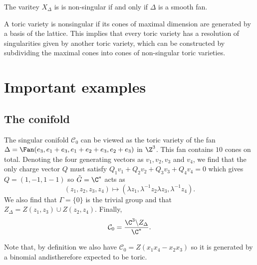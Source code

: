 \documentclass{worksheetclass}
\begin{document}
    \begin{prop*}
        The varitey $X_\Delta$ is is non-singular if and only if $\Delta$ is a smooth fan.
    \end{prop*}


    A toric variety is nonsingular if its cones of maximal dimension are generated by a basis of the lattice. This implies that every toric variety has a resolution of singularities given by another toric variety, which can be constructed by subdividing the maximal cones into cones of non-singular toric varieties.

\section{Important examples}

    \subsection{The conifold}

        The singular conifold $\mathcal{C}_0$ can be viewed as the toric variety of the fan $\Delta=\Fan(e_3,e_1+e_3,e_1+e_2+e_3,e_2+e_3)$ in $\Z^3$. This fan contains $10$ cones on total. Denoting the four generating vectors as $v_1,v_2,v_3$ and $v_4$, we find that the only charge vector $Q$ must satisfy $Q_1v_1+Q_2v_2+Q_3v_3+Q_4v_4=0$ which gives $Q=(1,-1,1-1)$ so $\tilde{G}=\C^*$ acts as
        \begin{equation}
            (z_1,z_2,z_3,z_4)\mapsto (\lambda z_1,\lambda^{-1} z_2\lambda z_3,\lambda^{-1} z_4).
        \end{equation}
        We also find that $\Gamma=\{0\}$ is the trivial group and that $Z_\Delta=Z(z_1,z_3)\cup Z(z_2,z_4)$. Finally,
        \begin{equation}
            \mathcal{C}_0=\frac{\C^3\backslash Z_\Delta}{\C^*}.
        \end{equation}

        Note that, by definition we also have $\mathcal{C}_0=Z(x_1x_4-x_2x_3)$ so it is generated by a binomial andistherefore expected to be toric. 
\end{document}
